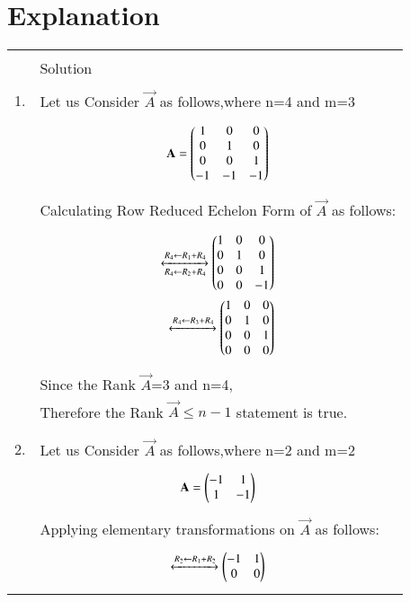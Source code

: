 \documentclass[journal,12pt]{IEEEtran}
\begin{document}
\section{\textbf{Explanation}}
\renewcommand{\thetable}{1}
\begin{longtable}{|l|l|}
\hline
\multirow{3}{*}{} & \\
option&Solution\\
\hline
&\\
1. &Let us Consider $\vec{A}$ as follows,where n=4 and m=3\\
&\parbox{6cm}{\begin{align}
    \mathbf{A}=\begin{pmatrix}1&0&0\\0&1&0\\0&0&1\\-1&-1&-1\end{pmatrix}
\end{align}}\\
&Calculating Row Reduced Echelon Form of $\vec{A}$ as follows:\\
&\parbox{6cm}{\begin{align}
    \xleftrightarrow[R_4 \leftarrow R_2+R_4]{R_4 \leftarrow R_1+R_4}
		\begin{pmatrix}1&0&0\\0&1&0\\0&0&1\\0&0&-1\end{pmatrix}\\
	\xleftrightarrow[]{R_4 \leftarrow R_3+R_4}
		\begin{pmatrix}1&0&0\\0&1&0\\0&0&1\\0&0&0\end{pmatrix}
\end{align}}\\
&Since the Rank  $\vec{A}$=3 and n=4,\\
&Therefore the Rank $\vec{A} \leq n-1$ statement is true.\\
&\\
\hline
\pagebreak
\hline
&\\
2.&Let us Consider $\vec{A}$ as follows,where n=2 and m=2\\
&\parbox{6cm}{\begin{align}
    \mathbf{A}=\begin{pmatrix}-1&1\\1&-1\end{pmatrix}
\end{align}}\\
&Applying elementary transformations on $\vec{A}$ as follows:\\
&\parbox{6cm}{\begin{align}
    \xleftrightarrow[]{R_2 \leftarrow R_1+R_2}
		\begin{pmatrix}-1&1\\0&0\end{pmatrix}
\end{align}}\\

\end{longtable}
\end{document}
